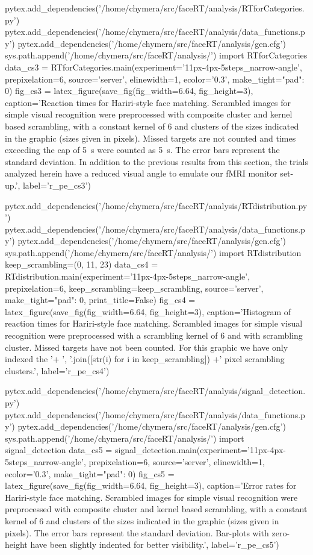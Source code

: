 \begin{pycode}
pytex.add_dependencies('/home/chymera/src/faceRT/analysis/RTforCategories.py')
pytex.add_dependencies('/home/chymera/src/faceRT/analysis/data_functions.py')
pytex.add_dependencies('/home/chymera/src/faceRT/analysis/gen.cfg')
sys.path.append('/home/chymera/src/faceRT/analysis/')
import RTforCategories
data_cs3 = RTforCategories.main(experiment='11px-4px-5steps_narrow-angle', prepixelation=6, source='server', elinewidth=1, ecolor='0.3', make_tight={"pad": 0})
fig_cs3 = latex_figure(save_fig(fig_width=6.64, fig_height=3), caption='Reaction times for Hariri-style face matching. Scrambled images for simple visual recognition were preprocessed with composite cluster and kernel based scrambling, with a constant kernel of \SI{6}{\pixel} and clusters of the sizes indicated in the graphic (sizes given in pixels). Missed targets are not counted and times exceeding the cap of \SI{5}{\second} were counted as \SI{5}{\second}. The error bars represent the standard deviation. In addition to the previous results from this section, the trials analyzed herein have a reduced visual angle to emulate our fMRI monitor set-up.', label='r_pe_cs3')
\end{pycode}
\begin{pycode}
pytex.add_dependencies('/home/chymera/src/faceRT/analysis/RTdistribution.py')
pytex.add_dependencies('/home/chymera/src/faceRT/analysis/data_functions.py')
pytex.add_dependencies('/home/chymera/src/faceRT/analysis/gen.cfg')
sys.path.append('/home/chymera/src/faceRT/analysis/')
import RTdistribution
keep_scrambling=(0, 11, 23)
data_cs4 = RTdistribution.main(experiment='11px-4px-5steps_narrow-angle', prepixelation=6, keep_scrambling=keep_scrambling, source='server', make_tight={"pad": 0}, print_title=False)
fig_cs4 = latex_figure(save_fig(fig_width=6.64, fig_height=3), caption='Histogram of reaction times for Hariri-style face matching. Scrambled images for simple visual recognition were preprocessed with a scrambling kernel of \SI{6}{\pixel} and with scrambling cluster. Missed targets have not been counted. For this graphic we have only indexed the '+ ', '.join([str(i) for i in keep_scrambling]) +' pixel scrambling clusters.', label='r_pe_cs4')
\end{pycode}
\begin{pycode}
pytex.add_dependencies('/home/chymera/src/faceRT/analysis/signal_detection.py')
pytex.add_dependencies('/home/chymera/src/faceRT/analysis/data_functions.py')
pytex.add_dependencies('/home/chymera/src/faceRT/analysis/gen.cfg')
sys.path.append('/home/chymera/src/faceRT/analysis/')
import signal_detection
data_cs5 = signal_detection.main(experiment='11px-4px-5steps_narrow-angle', prepixelation=6, source='server', elinewidth=1, ecolor='0.3', make_tight={"pad": 0})
fig_cs5 = latex_figure(save_fig(fig_width=6.64, fig_height=3), caption='Error rates for Hariri-style face matching. Scrambled images for simple visual recognition were preprocessed with composite cluster and kernel based scrambling, with a constant kernel of \SI{6}{\pixel} and clusters of the sizes indicated in the graphic (sizes given in pixels). The error bars represent the standard deviation. Bar-plots with zero-height have been slightly indented for better visibility.', label='r_pe_cs5')
\end{pycode}
